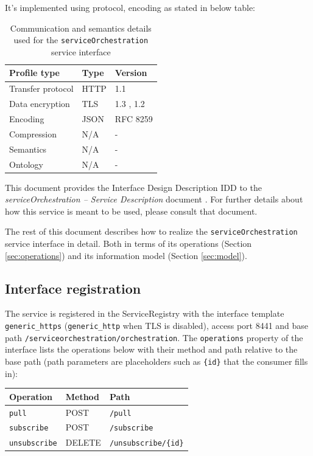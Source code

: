 \documentclass[a4paper]{arrowhead}
\begin{document}
It's implemented using protocol, encoding as stated in below table:
\begin{table}[ht!]
  \centering
  \begin{tabular}{|l|l|l|}
    \hline
    \rowcolor{gray!33} Profile type & Type & Version \\ \hline
    Transfer protocol & HTTP & 1.1 \cite{rfc9112} \\ \hline
    Data encryption & TLS & 1.3 \cite{rfc8446}, 1.2 \cite{rfc5246} \\ \hline
    Encoding & JSON & RFC 8259 \cite{rfc8259} \\ \hline
    Compression & N/A & - \\ \hline
    Semantics & N/A & - \\ \hline
    Ontology & N/A & - \\ \hline
  \end{tabular}
  \caption{Communication and semantics details used for the \texttt{service\allowbreak{}Orchestration} service interface}
  \label{tab:comunication_semantics_profile}
\end{table}

This document provides the Interface Design Description IDD to the \textit{serviceOrchestration -- Service Description} document \cite{dso-serviceOrchestration-sd}.
For further details about how this service is meant to be used, please consult that document.

The rest of this document describes how to realize the \texttt{service\allowbreak{}Orchestration} service
interface in detail. Both in terms of its operations (Section \ref{sec:operations}) and its information model (Section \ref{sec:model}).

\subsection{Interface registration}

The service is registered in the ServiceRegistry with the interface template \texttt{generic\_\allowbreak{}https} (\texttt{generic\_\allowbreak{}http} when TLS is disabled), access port 8441 and base path \texttt{/\allowbreak{}serviceorchestration/\allowbreak{}orchestration}. The \texttt{operations} property of the interface lists the operations below with their method and path relative to the base path (path parameters are placeholders such as \texttt{\{id\}} that the consumer fills in):

\noindent\begin{longtable}{| p{5.2cm} | p{1.6cm} | p{8.4cm} |} \hline
\rowcolor{gray!33} Operation & Method & Path \\ \hline \endhead
\texttt{pull} & POST & \texttt{/\allowbreak{}pull} \\ \hline
\texttt{subscribe} & POST & \texttt{/\allowbreak{}subscribe} \\ \hline
\texttt{unsubscribe} & DELETE & \texttt{/\allowbreak{}unsubscribe/\allowbreak{}\{id\}} \\ \hline
\end{longtable}
\end{document}
